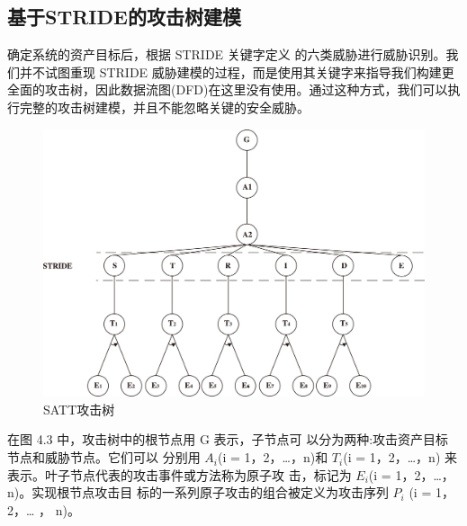 \subsection{基于STRIDE的攻击树建模}
确定系统的资产目标后，根据 STRIDE 关键字定义
的六类威胁进行威胁识别。我们并不试图重现 STRIDE
威胁建模的过程，而是使用其关键字来指导我们构建更
全面的攻击树，因此数据流图(DFD)在这里没有使用。通过这种方式，我们可以执
行完整的攻击树建模，并且不能忽略关键的安全威胁。
\begin{figure}
    \centering
    \includegraphics[scale=0.5]{resources/img/a14.jpg}
    \caption{SATT攻击树}
  \end{figure}
\newline
在图 4.3 中，攻击树中的根节点用 G 表示，子节点可
以分为两种:攻击资产目标节点和威胁节点。它们可以
分别用 $A_i$(i = 1，2，…，n)和 $T_i$(i = 1，2，…，n)
来表示。叶子节点代表的攻击事件或方法称为原子攻
击，标记为 $E_i$(i = 1，2，…，n)。实现根节点攻击目
标的一系列原子攻击的组合被定义为攻击序列 $P_i$ (i =
1，2，… ， n)。
